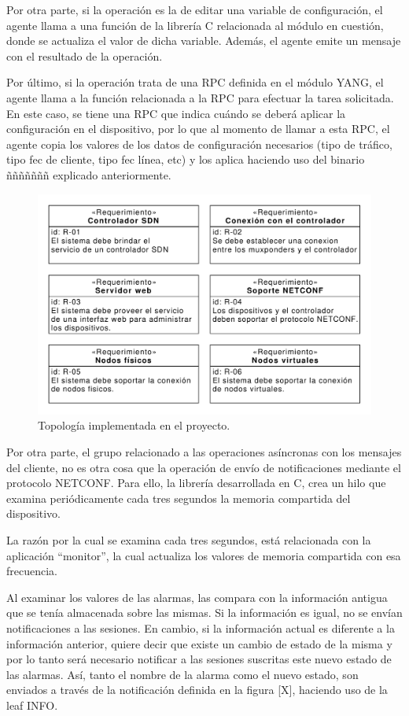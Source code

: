   Por otra parte, si la operación es la de editar una variable de configuración, el agente llama a una función de la librería C relacionada al módulo en cuestión, donde se actualiza el valor de dicha variable. Además, el agente emite un mensaje con el resultado de la operación. 

  Por último, si la operación trata de una RPC definida en el módulo YANG, el agente llama a la función relacionada a la RPC para efectuar la tarea solicitada. En este caso, se tiene una RPC que indica cuándo se deberá aplicar la configuración en el dispositivo, por lo que al momento de llamar a esta RPC, el agente copia los valores de los datos de configuración necesarios (tipo de tráfico, tipo fec de cliente, tipo fec línea, etc) y los aplica haciendo uso del binario ñññññññ explicado anteriormente.

  \begin{figure}[H]
    \centering
    \includegraphics[scale=0.65]{Figures/req_sys.pdf}
    \caption{Topología implementada en el proyecto.}
    \label{fig:req_sys}
  \end{figure}

  Por otra parte, el grupo relacionado a las operaciones asíncronas con los mensajes del cliente, no es otra cosa que la operación de envío de notificaciones mediante el protocolo NETCONF. Para ello, la librería desarrollada en C, crea un hilo que examina periódicamente cada tres segundos la memoria compartida del dispositivo. 
  
  La razón por la cual se examina cada tres segundos, está relacionada con la aplicación “monitor”, la cual actualiza los valores de memoria compartida con esa frecuencia.

  Al examinar los valores de las alarmas, las compara con la información antigua que se tenía almacenada sobre las mismas. Si la información es igual, no se envían notificaciones a las sesiones. En cambio, si la información actual es diferente a la información anterior, quiere decir que existe un cambio de estado de la misma y por lo tanto será necesario notificar a las sesiones suscritas este nuevo estado de las alarmas. Así, tanto el nombre de la alarma como el nuevo estado, son enviados a través de la notificación definida en la figura [X], haciendo uso de la leaf INFO.
  
